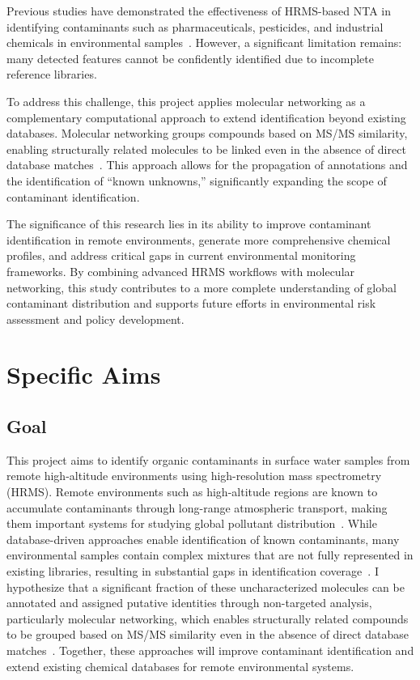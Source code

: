 \documentclass[11pt]{article}
\begin{document}
\begin{doublespace}
    Previous studies have demonstrated the effectiveness of HRMS-based NTA in identifying contaminants such as pharmaceuticals, pesticides, and industrial chemicals in environmental samples~\cite{Gray2022, NinoSuastegui2025}.
    However, a significant limitation remains: many detected features cannot be confidently identified due to incomplete reference libraries.

    To address this challenge, this project applies molecular networking as a complementary computational approach to extend identification beyond existing databases.
    Molecular networking groups compounds based on MS/MS similarity, enabling structurally related molecules to be linked even in the absence of direct database matches~\cite{Wang2016, Schmid2021, Bittremieux2022}.
    This approach allows for the propagation of annotations and the identification of “known unknowns,” significantly expanding the scope of contaminant identification.

    The significance of this research lies in its ability to improve contaminant identification in remote environments, generate more comprehensive chemical profiles, and address critical gaps in current environmental monitoring frameworks.
    By combining advanced HRMS workflows with molecular networking, this study contributes to a more complete understanding of global contaminant distribution and supports future efforts in environmental risk assessment and policy development.

\section{Specific Aims}
    \subsection{Goal}
    This project aims to identify organic contaminants in surface water samples from remote high-altitude environments using high-resolution mass spectrometry (HRMS).
    Remote environments such as high-altitude regions are known to accumulate contaminants through long-range atmospheric transport, making them important systems for studying global pollutant distribution~\cite{Daly2005, Xu2011, Catalan2015}.
    While database-driven approaches enable identification of known contaminants, many environmental samples contain complex mixtures that are not fully represented in existing libraries, resulting in substantial gaps in identification coverage~\cite{Schulze2020, Manz}.
    I hypothesize that a significant fraction of these uncharacterized molecules can be annotated and assigned putative identities through non-targeted analysis, particularly molecular networking, which enables structurally related compounds to be grouped based on MS/MS similarity even in the absence of direct database matches~\cite{Wang2016, Schmid2021}.
    Together, these approaches will improve contaminant identification and extend existing chemical databases for remote environmental systems.


\end{doublespace}
\end{document}
